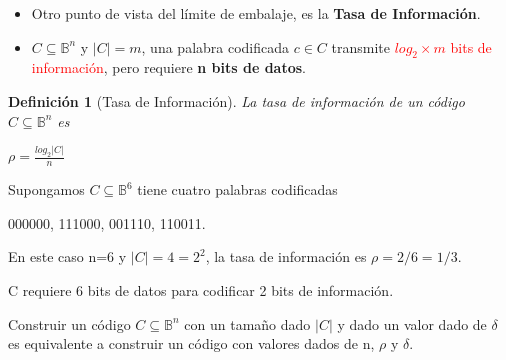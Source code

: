 \documentclass{beamer}
\theoremstyle{plain}
\newtheorem{definicion} [Definicion]{Definición}
\theoremstyle{example}
\theoremstyle{example}
\begin{document}
\begin{frame}  \small  


\begin{itemize} 

\item  Otro punto de vista del límite de embalaje, es la \textbf{Tasa de Información}.

\item  $C\subseteq \mathbb{B}^n$ y $|C| = m$, una palabra codificada $c \in C$ transmite  \textcolor{red}{$log_2 \times m$ bits de información}, pero requiere \textbf{n bits de datos}.


\end{itemize}

\begin{definicion}[Tasa de Información]

La tasa de información de un código $C \subseteq \mathbb{B}^n$ es

\begin{center}
$\rho = \frac{log_2|C|}{n}$
\end{center}
\end{definicion}


Supongamos $C \subseteq \mathbb{B}^6$ tiene cuatro palabras codificadas

\begin{center}
000000, 111000, 001110, 110011.
\end{center}

 En este caso n=6 y $|C| = 4 = 2^2$, la tasa de información  es $\rho = 2/6 = 1/3$.  \\
\vspace{0.2cm}

  C requiere 6 bits de datos para codificar 2 bits de información. \\

\vspace{0.2cm}

 Construir un código  $C \subseteq \mathbb{B}^n$  con un  tamaño dado $|C|$ y dado un valor dado de $\delta$ es equivalente a construir un código con valores dados de n, $\rho$ y $\delta$. 

 \end{frame} 

\end{document}
